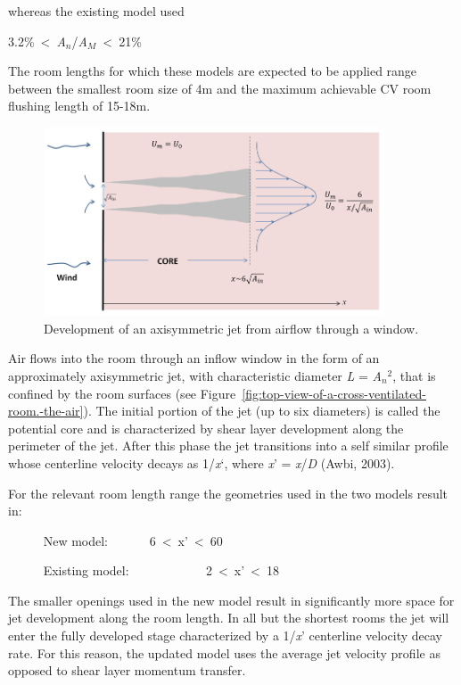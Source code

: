 whereas the existing model used

3.2\%~\textless{}~\emph{A}\(_{n}\)/\emph{A}\(_{M}\)~\textless{}~21\%

The room lengths for which these models are expected to be applied range between the smallest room size of 4m and the maximum achievable CV room flushing length of 15-18m.

\begin{figure}[hbtp] %
\centering
\includegraphics[width=0.9\textwidth, height=0.9\textheight, keepaspectratio=true]{media/image2622.png}
\caption{Development of an axisymmetric jet from airflow through a window. \protect \label{fig:development-of-an-axisymmetric-jet-from}}
\end{figure}

Air flows into the room through an inflow window in the form of an approximately axisymmetric jet, with characteristic diameter \emph{L} = \emph{A}\(_{n}\)\(^{2}\), that is confined by the room surfaces (see Figure~\ref{fig:top-view-of-a-cross-ventilated-room.-the-air}). The initial portion of the jet (up to six diameters) is called the potential core and is characterized by shear layer development along the perimeter of the jet. After this phase the jet transitions into a self similar profile whose centerline velocity decays as 1/\emph{x}`, where \emph{x}' = \emph{x}/\emph{D} (Awbi, 2003).

For the relevant room length range the geometries used in the two models result in:

~~~~~ New model:~~~~~~ 6~\textless{}~x'~\textless{}~60

~~~~~ Existing model: ~~~~~~~~~~~ 2~\textless{}~x'~\textless{}~18

The smaller openings used in the new model result in significantly more space for jet development along the room length. In all but the shortest rooms the jet will enter the fully developed stage characterized by a 1/\emph{x}' centerline velocity decay rate. For this reason, the updated model uses the average jet velocity profile as opposed to shear layer momentum transfer.

